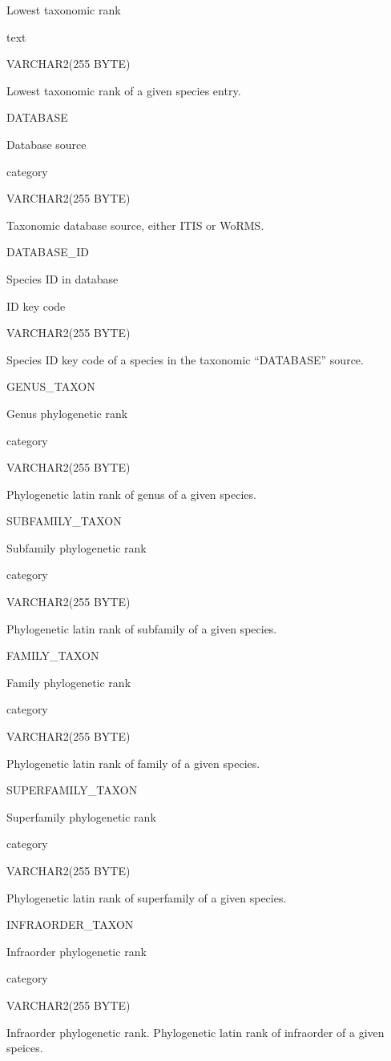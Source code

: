 \documentclass[
  letterpaper,
  oneside,
  open=any]{scrbook}
\begin{document}
Lowest taxonomic rank

text

VARCHAR2(255 BYTE)

Lowest taxonomic rank of a given species entry.

DATABASE

Database source

category

VARCHAR2(255 BYTE)

Taxonomic database source, either ITIS or WoRMS.

DATABASE\_ID

Species ID in database

ID key code

VARCHAR2(255 BYTE)

Species ID key code of a species in the taxonomic ``DATABASE'' source.

GENUS\_TAXON

Genus phylogenetic rank

category

VARCHAR2(255 BYTE)

Phylogenetic latin rank of genus of a given species.

SUBFAMILY\_TAXON

Subfamily phylogenetic rank

category

VARCHAR2(255 BYTE)

Phylogenetic latin rank of subfamily of a given species.

FAMILY\_TAXON

Family phylogenetic rank

category

VARCHAR2(255 BYTE)

Phylogenetic latin rank of family of a given species.

SUPERFAMILY\_TAXON

Superfamily phylogenetic rank

category

VARCHAR2(255 BYTE)

Phylogenetic latin rank of superfamily of a given species.

INFRAORDER\_TAXON

Infraorder phylogenetic rank

category

VARCHAR2(255 BYTE)

Infraorder phylogenetic rank. Phylogenetic latin rank of infraorder of a
given speices.
\end{document}
